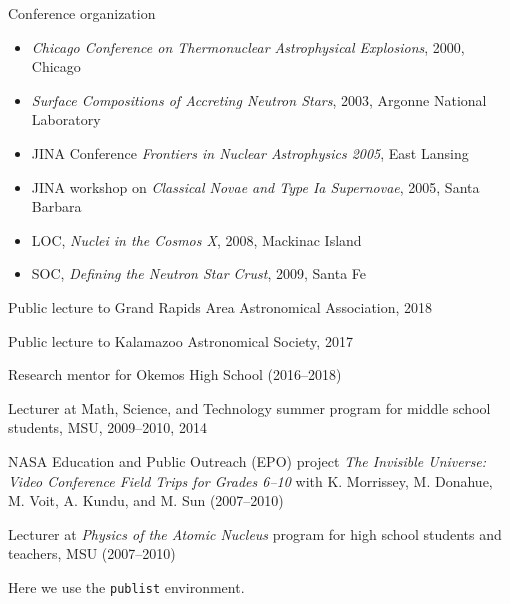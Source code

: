 \documentclass[11pt]{vitae}
\begin{document}
\begin{genericlist}
\item Conference organization
	\begin{itemize}
		\item[] \emph{Chicago Conference on Thermonuclear Astrophysical Explosions}, 2000, Chicago
		\item[] \emph{Surface Compositions of Accreting Neutron Stars}, 2003, Argonne National Laboratory
		\item[] JINA Conference \emph{Frontiers in Nuclear Astrophysics 2005}, East Lansing
		\item[] JINA workshop on \emph{Classical Novae and Type Ia Supernovae}, 2005, Santa Barbara
		\item[] LOC, \emph{Nuclei in the Cosmos X}, 2008, Mackinac Island
		\item[] SOC, \emph{Defining the Neutron Star Crust}, 2009, Santa Fe
	\end{itemize}
\end{genericlist}

\clearpage
{}
\begin{genericlist}
\item Public lecture to Grand Rapids Area Astronomical Association, 2018
\item Public lecture to Kalamazoo Astronomical Society, 2017
\item Research mentor for Okemos High School (2016--2018)
\item Lecturer at Math, Science, and Technology summer program for middle school students, MSU, 2009--2010, 2014
\item NASA Education and Public Outreach (EPO) project \emph{The Invisible Universe: Video Conference Field Trips for Grades 6--10} with K. Morrissey, M. Donahue, M. Voit, A. Kundu, and M. Sun (2007--2010)
\item Lecturer at \emph{Physics of the Atomic Nucleus} program for high school students and teachers, MSU (2007--2010)
\end{genericlist}

\clearpage


Here we use the \verb+publist+ environment.
\end{document}
